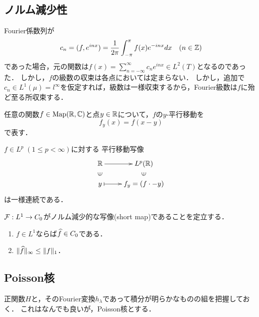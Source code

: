 \documentclass[uplatex,dvipdfmx]{jsreport}
\begin{document}
\subsection{ノルム減少性}

\begin{discussion}[Fourier級数に関する逆転公式]
    Fourier係数列が
    \[c_n=(f,e^{inx})=\frac{1}{2\pi}\int^\pi_{-\pi}f(x)e^{-inx}dx\quad(n\in\mathbb{Z})\]
    であった場合，元の関数は$f(x)=\sum^\infty_{n=-\infty}c_ne^{inx}\in L^2(T)$となるのであった．
    しかし，$f$の級数の収束は各点においては定まらない．
    しかし，追加で$c_n\in L^1(\mu)=l^\infty$を仮定すれば，級数は一様収束するから，Fourier級数は$f$に殆ど至る所収束する．
\end{discussion}

\begin{notation}
    任意の関数$f\in\mathrm{Map}(\mathbb{R},\mathbb{C})$と点$y\in\mathbb{R}$について，$f$の$y$-平行移動を
    \[f_y(x)=f(x-y)\]
    で表す．
\end{notation}

\begin{lemma}
    $f\in L^p\;(1\le p<\infty)$に対する
    平行移動写像
    \[\xymatrix@R-2pc{
        \R\ar[r]&L^p(\R)\\
        \rotatebox[origin=c]{90}{$\in$}&\rotatebox[origin=c]{90}{$\in$}\\
        y\ar@{|->}[r]&f_y=(f\cdot-y)
    }\]
    は一様連続である．
\end{lemma}

\begin{theorem}
    $\mathcal{F}:L^1\to C_0$がノルム減少的な写像(short map)であることを定立する．
    \begin{enumerate}
        \item $f\in L^1$ならば$\widehat{f}\in C_0$である．
        \item $\|\widehat{f}\|_\infty\le\|f\|_1$．
    \end{enumerate}
\end{theorem}

\subsection{Poisson核}

\begin{tcolorbox}[colframe=ForestGreen, colback=ForestGreen!10!white,breakable,colbacktitle=ForestGreen!40!white,coltitle=black,fonttitle=\bfseries\sffamily,
title=]
    正関数$H$と，そのFourier変換$h_\lambda$であって積分が明らかなものの組を把握しておく．
    これはなんでも良いが，Poisson核とする．
\end{tcolorbox}
\end{document}
